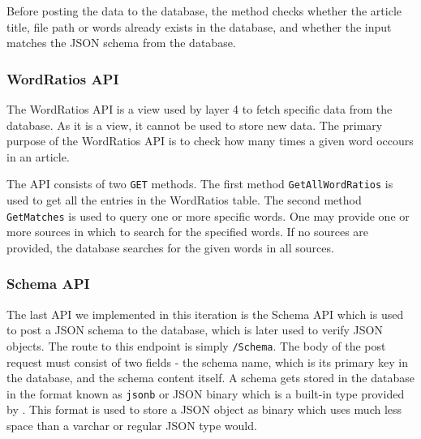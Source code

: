 Before posting the data to the database, the method checks whether the article title, file path or words already exists in the database, and whether the input matches the JSON schema from the database.


\subsubsection{WordRatios API}
The WordRatios API is a view used by layer 4 to fetch specific data from the database.
As it is a view, it cannot be used to store new data. 
The primary purpose of the WordRatios API is to check how many times a given word occours in an article.

The API consists of two \texttt{GET} methods. 
The first method \texttt{GetAllWordRatios} is used to get all the entries in the WordRatios table.
The second method \texttt{GetMatches} is used to query one or more specific words. 
One may provide one or more sources in which to search for the specified words.
If no sources are provided, the database searches for the given words in all sources.

\subsubsection{Schema API}

The last API we implemented in this iteration is the Schema API which is used to post a JSON schema to the database, which is later used to verify JSON objects.
The route to this endpoint is simply \texttt{/Schema}. 
The body of the post request must consist of two fields - the schema name, which is its primary key in the database, and the schema content itself. 
A schema gets stored in the database in the format known as \texttt{jsonb} or JSON binary which is a built-in type provided by \postgres{}.
This format is used to store a JSON object as binary which uses much less space than a varchar or regular JSON type would.



